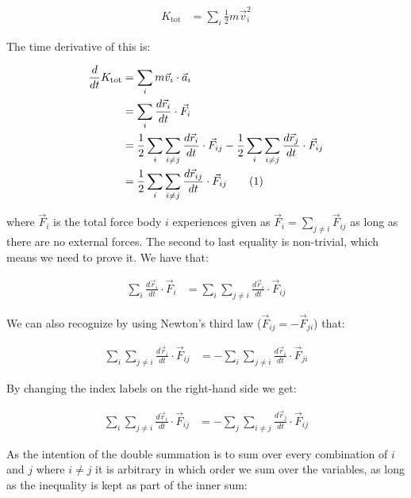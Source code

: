 \documentclass[reprint,english,notitlepage]{revtex4-1}  %
\newcommand\numberthis{\addtocounter{equation}{1}\tag{\theequation}}
\begin{document}
\begin{align*}
K_\text{tot} &= \sum\limits_i \frac{1}{2} m \vec{v}_i^2
\end{align*}

The time derivative of this is:

\begin{align*}
\frac{d}{dt} K_\text{tot} &= \sum\limits_i m \vec{v}_i \cdot \vec{a}_i \\
&= \sum\limits_i \frac{d\vec{r}_i}{dt} \cdot \vec{F}_i \\
&= \frac{1}{2}\sum\limits_i \sum\limits_{i\neq j} \frac{d\vec{r}_i}{dt} \cdot \vec{F}_{ij} - \frac{1}{2}\sum\limits_i \sum\limits_{i\neq j} \frac{d\vec{r}_j}{dt} \cdot \vec{F}_{ij} \\
&= \frac{1}{2}\sum\limits_i \sum\limits_{i\neq j} \frac{d\vec{r}_{ij}}{dt} \cdot \vec{F}_{ij} \numberthis \label{eq:kin_en_der1}
\end{align*}


where $\vec{F}_i$ is the total force body $i$ experiences given as $\vec{F}_i = \sum\limits_{j\neq i} \vec{F}_{ij}$ as long as there are no external forces. The second to last equality is non-trivial, which means we need to prove it. We have that:

\begin{align*}
\sum\limits_i \frac{d\vec{r}_i}{dt} \cdot \vec{F}_i &= \sum\limits_i \sum\limits_{j \neq i} \frac{d\vec{r}_i}{dt} \cdot \vec{F}_{ij}
\end{align*}

We can also recognize by using Newton's third law ($\vec{F}_{ij} = - \vec{F}_{ji}$) that:

\begin{align*}
\sum\limits_i \sum\limits_{j \neq i} \frac{d\vec{r}_i}{dt} \cdot \vec{F}_{ij} &= -\sum\limits_i \sum\limits_{j \neq i} \frac{d\vec{r}_i}{dt} \cdot \vec{F}_{ji}
\end{align*}

By changing the index labels on the right-hand side we get:

\begin{align*}
\sum\limits_i \sum\limits_{j \neq i} \frac{d\vec{r}_i}{dt} \cdot \vec{F}_{ij} &= -\sum\limits_j \sum\limits_{i \neq j} \frac{d\vec{r}_j}{dt} \cdot \vec{F}_{ij}
\end{align*}

As the intention of the double summation is to sum over every combination of $i$ and $j$ where $i\neq j$ it is arbitrary in which order we sum over the variables, as long as the inequality is kept as part of the inner sum:
\end{document}

